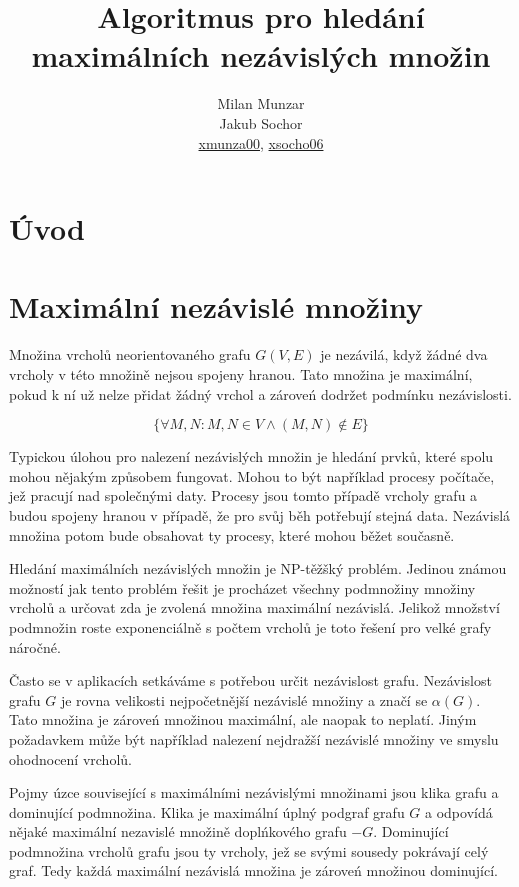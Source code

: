 \documentclass[12pt]{article}
\title{Algoritmus pro hledání maximálních nezávislých množin}
\author{Milan Munzar\\
Jakub Sochor\\
\normalsize{\url{xmunza00}, \url{xsocho06} }}
\date{}
\begin{document}
\maketitle

\section{Úvod}



\section{Maximální nezávislé množiny}

Množina vrcholů neorientovaného grafu \(G(V,E)\) je nezávilá, když žádné dva vrcholy v této množině nejsou spojeny hranou. Tato množina je maximální, pokud k ní už nelze přidat žádný vrchol a zároveń dodržet podmínku nezávislosti.

\begin{equation*}
\{\forall M,N : M,N \in V \land (M,N) \notin E \}
\end{equation*}

Typickou úlohou pro nalezení nezávislých množin je hledání prvků, které spolu mohou nějakým způsobem fungovat. Mohou to být například procesy počítače, jež pracují nad společnými daty. Procesy jsou tomto případě vrcholy grafu a budou spojeny hranou v případě, že pro svůj běh potřebují stejná data. Nezávislá množina potom bude obsahovat ty procesy, které mohou běžet současně.

Hledání maximálních nezávislých množin je NP-těžšký problém. Jedinou známou možností jak tento problém řešit je procházet všechny podmnožiny množiny vrcholů a určovat zda je zvolená množina maximální nezávislá. Jelikož množství podmnožin roste exponenciálně s počtem vrcholů je toto řešení pro velké grafy náročné.

Často se v aplikacích  setkáváme s potřebou určit nezávislost grafu. Nezávislost grafu \(G\) je rovna velikosti nejpočetnější nezávislé množiny a značí se \(\alpha(G)\). Tato množina je zároveń množinou maximální, ale naopak to neplatí. Jiným požadavkem může být například nalezení nejdražší nezávislé množiny ve smyslu ohodnocení vrcholů.

Pojmy úzce související s maximálními nezávislými množinami jsou klika grafu a dominující podmnožina. Klika je maximální úplný podgraf grafu \(G\) a odpovídá nějaké maximální nezavislé množině doplńkového grafu \(-G\). Dominující podmnožina vrcholů grafu jsou ty vrcholy, jež se svými sousedy pokrávají celý graf. Tedy každá maximální nezávislá množina je zároveń množinou dominující.
\end{document}
